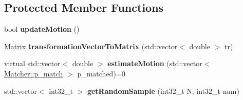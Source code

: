 \subsection*{Protected Member Functions}
\begin{DoxyCompactItemize}
\item 
\hypertarget{class_visual_odometry_a9caa39c2a95ede9ee423a60c49781324}{bool {\bfseries update\+Motion} ()}\label{class_visual_odometry_a9caa39c2a95ede9ee423a60c49781324}

\item 
\hypertarget{class_visual_odometry_af98bab368513d4c69a6e49f5f3220dc8}{\hyperlink{class_matrix}{Matrix} {\bfseries transformation\+Vector\+To\+Matrix} (std\+::vector$<$ double $>$ tr)}\label{class_visual_odometry_af98bab368513d4c69a6e49f5f3220dc8}

\item 
\hypertarget{class_visual_odometry_a744ce1154259dcf50a4632c1da93310b}{virtual std\+::vector$<$ double $>$ {\bfseries estimate\+Motion} (std\+::vector$<$ \hyperlink{struct_matcher_1_1p__match}{Matcher\+::p\+\_\+match} $>$ p\+\_\+matched)=0}\label{class_visual_odometry_a744ce1154259dcf50a4632c1da93310b}

\item 
\hypertarget{class_visual_odometry_a2d416460beaa8ef87cb5d9ce45ce25b2}{std\+::vector$<$ int32\+\_\+t $>$ {\bfseries get\+Random\+Sample} (int32\+\_\+t N, int32\+\_\+t num)}\label{class_visual_odometry_a2d416460beaa8ef87cb5d9ce45ce25b2}

\end{DoxyCompactItemize}
